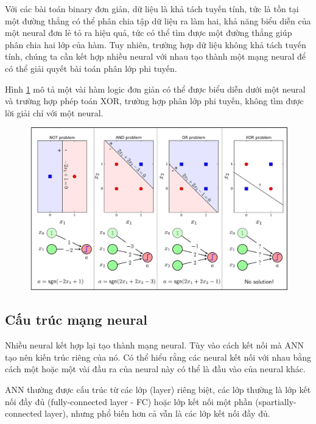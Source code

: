 Với các bài toán binary đơn giản, dữ liệu là khả tách tuyến tính, tức là tồn tại một đường thẳng có thể phân chia tập dữ liệu ra làm hai, khả năng biểu diễn của một neural đơn lẻ tỏ ra hiệu quả, tức có thể tìm được một đường thẳng giúp phân chia hai lớp của hàm. Tuy nhiên, trường hợp dữ liệu không khả tách tuyến tính, chúng ta cần kết hợp nhiều neural với nhau tạo thành một mạng neural để có thể giải quyết bài toán phân lớp phi tuyến.


Hình \ref{chap2:neural_logic} mô tả một vài hàm logic đơn giản có thể được biểu diễn dưới một neural và trường hợp phép toán XOR, trường hợp phân lớp phi tuyến, không tìm được lời giải chỉ với một neural.
\begin{center}
    \begin{figure}[H]
    \centering
    \includegraphics[width=1\columnwidth]{images/chap2/logic_nn.png}
    \label{chap2:neural_logic}
    \end{figure}
\end{center}

\subsection{ Cấu trúc mạng neural}
Nhiều neural kết hợp lại tạo thành mạng neural. Tùy vào cách kết nối mà ANN tạo nên kiến trúc riêng của nó. Có thể hiểu rằng các neural kết nối với nhau bằng cách một hoặc một vài đầu ra của neural này có thể là đầu vào của neural khác.

ANN thường được cấu trúc từ các lớp (layer) riêng biệt, các lớp thường là lớp kết nối đầy đủ (fully-connected layer - FC) hoặc lớp kết nối một phần (spartially-connected layer), nhưng phổ biến hơn cả vẫn là các lớp kết nối đầy đủ.

